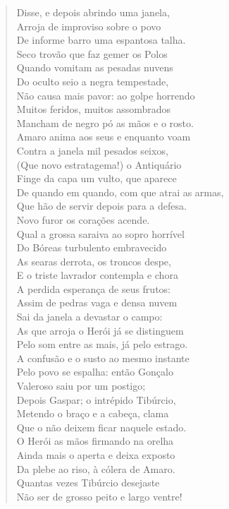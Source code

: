 \begin{verse}
Disse, e depois abrindo uma janela,\\
Arroja de improviso sobre o povo\\
De informe barro uma espantosa talha.\\
Seco trovão que faz gemer os Polos\\
Quando vomitam as pesadas nuvens\\
Do oculto seio a negra tempestade,\\
Não causa mais pavor: ao golpe horrendo\\
Muitos feridos, muitos assombrados\\
Mancham de negro pó as mãos e o rosto.\\
Amaro anima aos seus e enquanto voam\\
Contra a janela mil pesados seixos,\\
(Que novo estratagema!) o Antiquário\\
Finge da capa um vulto, que aparece\\
De quando em quando, com que atrai as \qb{}armas,\\
Que hão de servir depois para a defesa. \\[10pt]


Novo furor os corações acende.\\
Qual a grossa saraiva ao sopro horrível\\
Do Bóreas turbulento embravecido\\		\index{\Borea}
As searas derrota, os troncos despe,\\
E o triste lavrador contempla e chora\\
A perdida esperança de seus frutos:\\
Assim de pedras vaga e densa nuvem\\
Sai da janela a devastar o campo:\\
As que arroja o Herói já se distinguem\\
Pelo som entre as mais, já pelo estrago.\\
A confusão e o susto ao mesmo instante\\
Pelo povo se espalha: então Gonçalo\\
Valeroso saiu por um postigo;\\
Depois Gaspar; o intrépido Tibúrcio,\\
Metendo o braço e a cabeça, clama\\
Que o não deixem ficar naquele estado.\\
O Herói as mãos firmando na orelha\\
Ainda mais o aperta e deixa exposto\\
Da plebe ao riso, à cólera de Amaro.\\
Quantas vezes Tibúrcio desejaste\\
Não ser de grosso peito e largo ventre! \\[10pt]



\end{verse}
